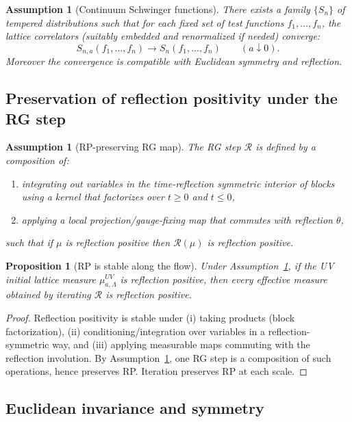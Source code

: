 \documentclass[11pt]{article}
\newtheorem{proposition}[theorem]{Proposition}
\newtheorem{assumption}[theorem]{Assumption}
\theoremstyle{definition}
\newcommand{\1}{\mathbf{1}}
\begin{document}
\begin{assumption}[Continuum Schwinger functions]\label{ass:continuum}
There exists a family \(\{S_n\}\) of tempered distributions such that for each fixed set of test functions \(f_1,\dots,f_n\), the lattice correlators (suitably embedded and renormalized if needed) converge:
\[
S_{n,a}(f_1,\dots,f_n) \to S_n(f_1,\dots,f_n)\qquad (a\downarrow 0).
\]
Moreover the convergence is compatible with Euclidean symmetry and reflection.
\end{assumption}

\subsection{Preservation of reflection positivity under the RG step}

\begin{assumption}[RP-preserving RG map]\label{ass:RPpres}
The RG step \(\mathcal{R}\) is defined by a composition of:
\begin{enumerate}[label=(\roman*),leftmargin=2.6em]
\item integrating out variables in the time-reflection symmetric interior of blocks using a kernel that factorizes over \(t\ge 0\) and \(t\le 0\),
\item applying a local projection/gauge-fixing map that commutes with reflection \(\theta\),
\end{enumerate}
such that if \(\mu\) is reflection positive then \(\mathcal{R}(\mu)\) is reflection positive.
\end{assumption}

\begin{proposition}[RP is stable along the flow]
Under Assumption~\ref{ass:RPpres}, if the UV initial lattice measure \(\mu^{UV}_{a,\Lambda}\) is reflection positive, then every effective measure obtained by iterating \(\mathcal{R}\) is reflection positive.
\end{proposition}

\begin{proof}
Reflection positivity is stable under (i) taking products (block factorization), (ii) conditioning/integration over variables in a reflection-symmetric way, and (iii) applying measurable maps commuting with the reflection involution. By Assumption~\ref{ass:RPpres}, one RG step is a composition of such operations, hence preserves RP. Iteration preserves RP at each scale.
\end{proof}

\subsection{Euclidean invariance and symmetry}
\end{document}
